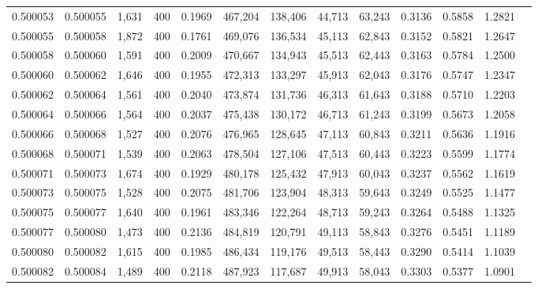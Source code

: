 \begin{tabular}{rrrrrrrrrrrrr}
0.500053 & 0.500055 &  1,631 & 400 &                                     0.1969 & 467,204 & 138,406 &  44,713 &  63,243 & 0.3136 & 0.5858 & 1.2821 \\
0.500055 & 0.500058 &  1,872 & 400 &                                     0.1761 & 469,076 & 136,534 &  45,113 &  62,843 & 0.3152 & 0.5821 & 1.2647 \\
0.500058 & 0.500060 &  1,591 & 400 &                                     0.2009 & 470,667 & 134,943 &  45,513 &  62,443 & 0.3163 & 0.5784 & 1.2500 \\
0.500060 & 0.500062 &  1,646 & 400 &                                     0.1955 & 472,313 & 133,297 &  45,913 &  62,043 & 0.3176 & 0.5747 & 1.2347 \\
0.500062 & 0.500064 &  1,561 & 400 &                                     0.2040 & 473,874 & 131,736 &  46,313 &  61,643 & 0.3188 & 0.5710 & 1.2203 \\
0.500064 & 0.500066 &  1,564 & 400 &                                     0.2037 & 475,438 & 130,172 &  46,713 &  61,243 & 0.3199 & 0.5673 & 1.2058 \\
0.500066 & 0.500068 &  1,527 & 400 &                                     0.2076 & 476,965 & 128,645 &  47,113 &  60,843 & 0.3211 & 0.5636 & 1.1916 \\
0.500068 & 0.500071 &  1,539 & 400 &                                     0.2063 & 478,504 & 127,106 &  47,513 &  60,443 & 0.3223 & 0.5599 & 1.1774 \\
0.500071 & 0.500073 &  1,674 & 400 &                                     0.1929 & 480,178 & 125,432 &  47,913 &  60,043 & 0.3237 & 0.5562 & 1.1619 \\
0.500073 & 0.500075 &  1,528 & 400 &                                     0.2075 & 481,706 & 123,904 &  48,313 &  59,643 & 0.3249 & 0.5525 & 1.1477 \\
0.500075 & 0.500077 &  1,640 & 400 &                                     0.1961 & 483,346 & 122,264 &  48,713 &  59,243 & 0.3264 & 0.5488 & 1.1325 \\
0.500077 & 0.500080 &  1,473 & 400 &                                     0.2136 & 484,819 & 120,791 &  49,113 &  58,843 & 0.3276 & 0.5451 & 1.1189 \\
0.500080 & 0.500082 &  1,615 & 400 &                                     0.1985 & 486,434 & 119,176 &  49,513 &  58,443 & 0.3290 & 0.5414 & 1.1039 \\
0.500082 & 0.500084 &  1,489 & 400 &                                     0.2118 & 487,923 & 117,687 &  49,913 &  58,043 & 0.3303 & 0.5377 & 1.0901 \\

\end{tabular}
